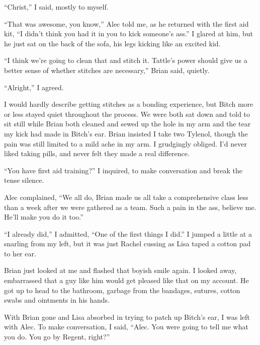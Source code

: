 ``Christ,'' I said, mostly to myself.



``That was awesome, you know,'' Alec told me, as he returned with the first aid kit, ``I didn't think you had it in you to kick someone's ass.''  I glared at him, but he just sat on the back of the sofa, his legs kicking like an excited kid.



``I think we're going to clean that and stitch it.  Tattle's power should give us a better sense of whether stitches are necessary,'' Brian said, quietly.



``Alright,'' I agreed.



I would hardly describe getting stitches as a bonding experience, but Bitch more or less stayed quiet throughout the process.  We were both sat down and told to sit still while Brian both cleaned and sewed up the hole in my arm and the tear my kick had made in Bitch's ear.  Brian insisted I take two Tylenol, though the pain was still limited to a mild ache in my arm.  I grudgingly obliged.  I'd never liked taking pills, and never felt they made a real difference.



``You have first aid training?'' I inquired, to make conversation and break the tense silence.



Alec complained, ``We all do, Brian made us all take a comprehensive class less than a week after we were gathered as a team.  Such a pain in the ass, believe me.  He'll make you do it too.''



``I already did,'' I admitted, ``One of the first things I did.''  I jumped a little at a snarling from my left, but it was just Rachel cussing as Lisa taped a cotton pad to her ear.



Brian just looked at me and flashed that boyish smile again.  I looked away, embarrassed that a guy like him would get pleased like that on my account.  He got up to head to the bathroom, garbage from the bandages, sutures, cotton swabs and ointments in his hands.



With Brian gone and Lisa absorbed in trying to patch up Bitch's ear, I was left with Alec.  To make conversation, I said, ``Alec.  You were going to tell me what you do.  You go by Regent, right?''



